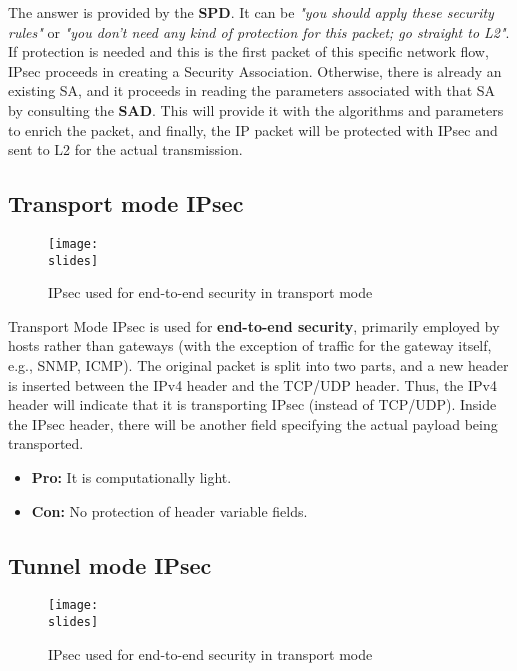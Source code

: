 The answer is provided by the \textbf{SPD}. It can be \textit{"you should apply these security rules"} or \textit{"you don't need any kind of protection for this packet; go straight to L2"}.
If protection is needed and this is the first packet of this specific network flow, IPsec proceeds in creating a Security Association. Otherwise, there is already an existing SA, and it proceeds in reading the parameters associated with that SA by consulting the \textbf{SAD}. This will provide it with the algorithms and parameters to enrich the packet, and finally, the IP packet will be protected with IPsec and sent to L2 for the actual transmission.



\subsection{Transport mode IPsec}
\begin{figure}[h]
    \centering
    \texttt{[image: \\slides]}
    \caption{IPsec used for end-to-end security in transport mode}
\end{figure}

Transport Mode IPsec is used for \textbf{end-to-end security}, primarily employed by hosts rather than gateways (with the exception of traffic for the gateway itself, e.g., SNMP, ICMP). The original packet is split into two parts, and a new header is inserted between the IPv4 header and the TCP/UDP header. Thus, the IPv4 header will indicate that it is transporting IPsec (instead of TCP/UDP). Inside the IPsec header, there will be another field specifying the actual payload being transported.
\begin{itemize}
    \item \textbf{Pro:} It is computationally light.
    \item \textbf{Con:} No protection of header variable fields.
\end{itemize}


\subsection{Tunnel mode IPsec}
\begin{figure}[h]
    \centering
    \texttt{[image: \\slides]}
    \caption{IPsec used for end-to-end security in transport mode}
\end{figure}

